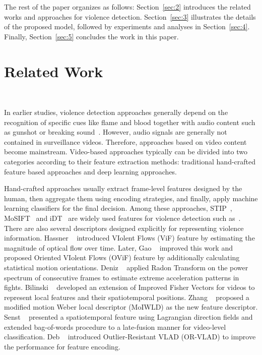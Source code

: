 \documentclass[10pt,twocolumn,letterpaper]{article}
\begin{document}
The rest of the paper organizes as follows:
Section~\ref{sec:2} introduces the related works and approaches for violence detection.
Section~\ref{sec:3} illustrates the details of the proposed model, followed by experiments and analyses in Section~\ref{sec:4}.
Finally, Section~\ref{sec:5} concludes the work in this paper.


\section{Related Work}
~\label{sec:2}

In earlier studies, violence detection approaches generally depend on the recognition of specific cues like flame and blood together with audio content such as gunshot or breaking sound~\cite{nam1998audio, cheng2003semantic, zajdel2007cassandra}.
However, audio signals are generally not contained in surveillance videos.
Therefore, approaches based on video content become mainstream.
Video-based approaches typically can be divided into two categories according to their feature extraction methods: traditional hand-crafted feature based approaches and deep learning approaches.

Hand-crafted approaches usually extract frame-level features designed by the human, then aggregate them using encoding strategies, and finally, apply machine learning classifiers for the final decision.
Among these approaches, STIP~\cite{STIPs}, MoSIFT~\cite{MoSIFT} and iDT~\cite{iDTs} are widely used features for violence detection such as~\cite{vio_sift, hockey, mosift_sc}.
There are also several descriptors designed explicitly for representing violence information.
Hassner \etal~\cite{vif} introduced VIolent Flows (ViF) feature by estimating the magnitude of optical flow over time.
Later, Gao \etal~\cite{ovif} improved this work and proposed Oriented VIolent Flows (OViF) feature by additionally calculating statistical motion orientations.
Deniz \etal~\cite{fast} applied Radon Transform on the power spectrum of consecutive frames to estimate extreme acceleration patterns in fights.
Bilinski \etal~\cite{bilinski2016human} developed an extension of Improved Fisher Vectors for videos to represent local features and their spatiotemporal positions.
Zhang \etal~\cite{MoIWLD} proposed a modified motion Weber local descriptor (MoIWLD) as the new feature descriptor.
Senst \etal~\cite{lagrangian} presented a spatiotemporal feature using Lagrangian direction fields and extended bag-of-words procedure to a late-fusion manner for video-level classification.
Deb \etal~\cite{vlad} introduced Outlier-Resistant VLAD (OR-VLAD) to improve the performance for feature encoding.
\end{document}
